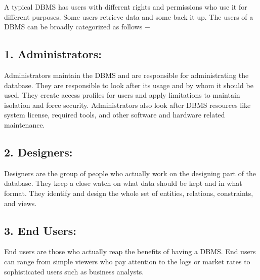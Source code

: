 \documentclass[11pt]{article}
\begin{document}
A typical DBMS has users with different rights and permissions who use it for different purposes. Some users retrieve data and some back it up. The users of a DBMS can be broadly categorized as follows −

\subsection*{1. Administrators:}
Administrators maintain the DBMS and are responsible for administrating the database. They are responsible to look after its usage and by whom it should be used. They create access profiles for users and apply limitations to maintain isolation and force security. Administrators also look after DBMS resources like system license, required tools, and other software and hardware related maintenance.\\
\subsection*{2. Designers:}
Designers are the group of people who actually work on the designing part of the database. They keep a close watch on what data should be kept and in what format. They identify and design the whole set of entities, relations, constraints, and views.\\
\subsection*{3. End Users:}
End users are those who actually reap the benefits of having a DBMS. End users can range from simple viewers who pay attention to the logs or market rates to sophisticated users such as business analysts.\\
\end{document}
